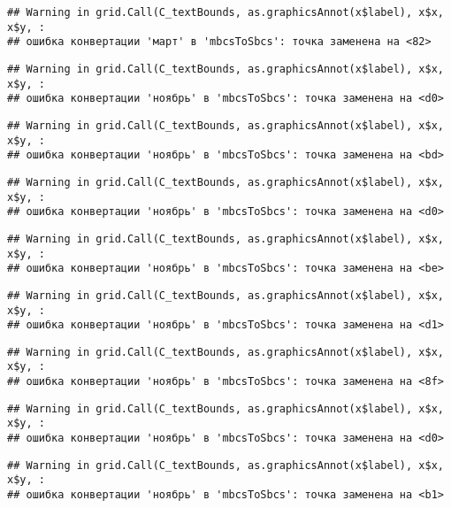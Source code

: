 \documentclass[
]{article}
\begin{document}
\begin{verbatim}
## Warning in grid.Call(C_textBounds, as.graphicsAnnot(x$label), x$x, x$y, :
## ошибка конвертации 'март' в 'mbcsToSbcs': точка заменена на <82>
\end{verbatim}

\begin{verbatim}
## Warning in grid.Call(C_textBounds, as.graphicsAnnot(x$label), x$x, x$y, :
## ошибка конвертации 'ноябрь' в 'mbcsToSbcs': точка заменена на <d0>
\end{verbatim}

\begin{verbatim}
## Warning in grid.Call(C_textBounds, as.graphicsAnnot(x$label), x$x, x$y, :
## ошибка конвертации 'ноябрь' в 'mbcsToSbcs': точка заменена на <bd>
\end{verbatim}

\begin{verbatim}
## Warning in grid.Call(C_textBounds, as.graphicsAnnot(x$label), x$x, x$y, :
## ошибка конвертации 'ноябрь' в 'mbcsToSbcs': точка заменена на <d0>
\end{verbatim}

\begin{verbatim}
## Warning in grid.Call(C_textBounds, as.graphicsAnnot(x$label), x$x, x$y, :
## ошибка конвертации 'ноябрь' в 'mbcsToSbcs': точка заменена на <be>
\end{verbatim}

\begin{verbatim}
## Warning in grid.Call(C_textBounds, as.graphicsAnnot(x$label), x$x, x$y, :
## ошибка конвертации 'ноябрь' в 'mbcsToSbcs': точка заменена на <d1>
\end{verbatim}

\begin{verbatim}
## Warning in grid.Call(C_textBounds, as.graphicsAnnot(x$label), x$x, x$y, :
## ошибка конвертации 'ноябрь' в 'mbcsToSbcs': точка заменена на <8f>
\end{verbatim}

\begin{verbatim}
## Warning in grid.Call(C_textBounds, as.graphicsAnnot(x$label), x$x, x$y, :
## ошибка конвертации 'ноябрь' в 'mbcsToSbcs': точка заменена на <d0>
\end{verbatim}

\begin{verbatim}
## Warning in grid.Call(C_textBounds, as.graphicsAnnot(x$label), x$x, x$y, :
## ошибка конвертации 'ноябрь' в 'mbcsToSbcs': точка заменена на <b1>
\end{verbatim}
\end{document}
